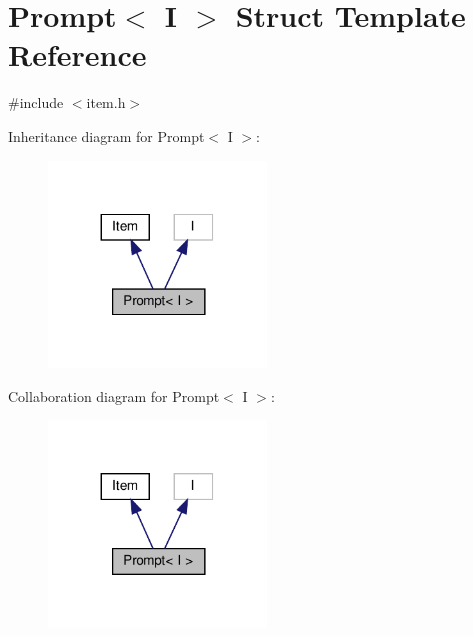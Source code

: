 \hypertarget{structPrompt}{}\section{Prompt$<$ I $>$ Struct Template Reference}
\label{structPrompt}


{\ttfamily \#include $<$item.\+h$>$}



Inheritance diagram for Prompt$<$ I $>$\+:\nopagebreak
\begin{figure}[H]
\begin{center}
\leavevmode
\includegraphics[width=164pt]{structPrompt__inherit__graph}
\end{center}
\end{figure}


Collaboration diagram for Prompt$<$ I $>$\+:\nopagebreak
\begin{figure}[H]
\begin{center}
\leavevmode
\includegraphics[width=164pt]{structPrompt__coll__graph}
\end{center}
\end{figure}
